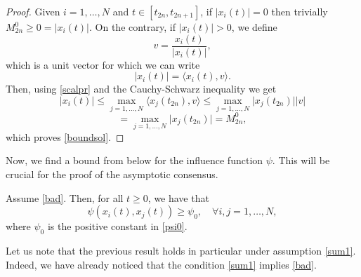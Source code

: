 \documentclass[a4paper,11pt,oneside]{article}
\begin{document}
	\begin{proof}
		Given $i=1,\dots,N$ and $t\in [t_{2n},t_{2n+1}]$, if $\lvert x_{i}(t)\rvert =0$ then trivially $M_{2n}^{0}\geq 0=\lvert x_{i}(t)\rvert $. On the contrary, if $\lvert x_{i}(t)\rvert >0$, we define $$v=\frac{x_{i}(t)}{\lvert x_{i}(t)\rvert},$$
		which is a unit vector for which we can write
		$$\lvert x_{i}(t)\rvert=\langle x_{i}(t),v\rangle. $$
		Then, using \eqref{scalpr} and the Cauchy-Schwarz inequality we get $$\lvert x_{i}(t)\rvert\leq \max_{j=1,\dots,N}\langle x_{j}(t_{2n}),v\rangle\leq \max_{j=1,\dots,N}\lvert x_{j}(t_{2n})\rvert\lvert v\rvert$$$$=\max_{j=1,\dots,N}\lvert x_{j}(t_{2n})\rvert=M_{2n}^{0},$$
		which proves \eqref{boundsol}.
	\end{proof}
Now, we find a bound from below for the influence function $\psi$. This will be crucial for the proof of the asymptotic consensus.
\begin{prop}\label{14nov}
	Assume \eqref{bad}. Then, for all $t\geq 0$, we have that
	\begin{equation}\label{min}
		\psi(x_{i}(t),x_{j}(t))\geq \psi_{0},\quad \forall i,j=1,\dots,N,
	\end{equation}
where $\psi_0$ is the positive constant in \eqref{psi0}.
\end{prop}
\begin{oss}
	Let us note that the previous result holds in particular under assumption \eqref{sum1}. Indeed, we have already noticed that the condition \eqref{sum1} implies \eqref{bad}.
\end{oss}
\end{document}
